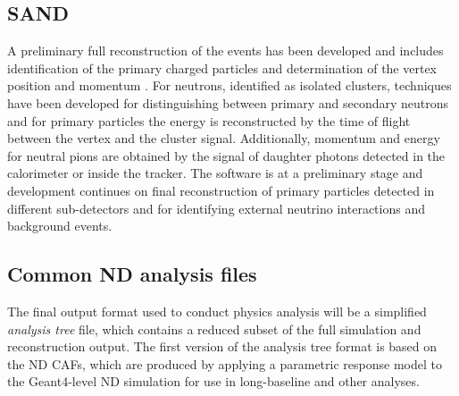 \documentclass[../main-v1.tex]{subfiles}
\begin{document}
\subsection{SAND}

A preliminary full reconstruction of the events has been developed and includes identification of the primary charged particles and determination of the vertex position and momentum . For neutrons, identified as isolated clusters, techniques have been developed for distinguishing between primary and secondary neutrons and for primary particles the energy is reconstructed by the time of flight between the vertex and the cluster signal. Additionally, momentum and energy for neutral pions are obtained by the signal of daughter photons detected in the calorimeter or inside the tracker.
The software is at a preliminary stage and development continues on final reconstruction of primary particles detected in different sub-detectors and for identifying external neutrino interactions and background events.

\subsection{Common ND analysis files}

The final output format used to conduct physics analysis will be a simplified
{\it analysis tree} file, which contains a reduced subset of the full simulation
and reconstruction output. The first version of the analysis tree format is
based on the ND CAFs, which are produced by applying a parametric response
model to the Geant4-level ND simulation for use in long-baseline and other analyses.
\end{document}
